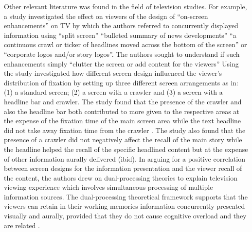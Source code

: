 \documentclass[output=paper]{langsci/langscibook}
\begin{document}
Other relevant literature was found in the field of television studies. For example, a study \citep{josephson2006} investigated the effect on viewers of  the design of ``on-screen enhancements'' on TV by which the authors referred to concurrently displayed information using ``split screen'' ``bulleted summary of news developments'' ``a continuous crawl or ticker of headlines moved across the bottom of the screen'' or ``corporate logos and/or story logos''.  The authors sought to understand if such enhancements simply ``clutter the screen or add content for the viewers'' Using  the study investigated how different screen design influenced the viewer's distribution of fixation by setting up three different screen arrangements as in: (1) a standard screen; (2) a screen with a crawler and (3) a screen with a headline bar and crawler.  The study found that the presence of the crawler and also the headline bar both contributed to more  given to the respective areas at the expense of the fixation time of the main screen area while the text headline did not take away fixation time from the crawler \citep[161]{josephson2006}. The study also found that the presence of a crawler did not negatively affect the recall of the main story while the headline helped the recall of the specific headlined content but at the expense of other information aurally delivered (ibid). In arguing for a positive correlation between screen designs for the information presentation and the viewer recall of the content, the authors drew on dual-processing theories to explain television viewing experience which involves simultaneous processing of multiple information sources. The dual-processing theoretical framework supports that the viewers can retain in their working memories information concurrently presented visually and aurally, provided that they do not cause cognitive overload and they are related \citep{Mayer1998}. 
\end{document}
